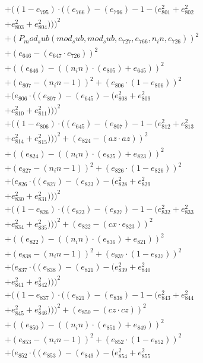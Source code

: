 \documentclass[10pt, a4paper]{article}
\begin{document}
\begin{small}
\begin{align*}
& + ((1 - e_{795})  \cdot  ((e_{766}) - (e_{796}) - 1 - (e_{801}^{2} + e_{802}^{2} \\
& + e_{803}^{2} + e_{804}^{2})))^{2} \\
& + (P_mod_sub(mod_sub, mod_sub, e_{727}, e_{766}, n_in, e_{726}))^{2} \\
& + (e_{646} - (e_{647}  \cdot  e_{726}))^{2} \\
& + ((e_{646}) - ((n_in)  \cdot  (e_{805}) + e_{645}))^{2} \\
& + (e_{807} - (n_in - 1))^{2} + (e_{806}  \cdot  (1 - e_{806}))^{2} \\
& + (e_{806}  \cdot  ((e_{807}) - (e_{645}) - (e_{808}^{2} + e_{809}^{2} \\
& + e_{810}^{2} + e_{811}^{2})))^{2} \\
& + ((1 - e_{806})  \cdot  ((e_{645}) - (e_{807}) - 1 - (e_{812}^{2} + e_{813}^{2} \\
& + e_{814}^{2} + e_{815}^{2})))^{2} + (e_{824} - (az  \cdot  az))^{2} \\
& + ((e_{824}) - ((n_in)  \cdot  (e_{825}) + e_{823}))^{2} \\
& + (e_{827} - (n_in - 1))^{2} + (e_{826}  \cdot  (1 - e_{826}))^{2} \\
& + (e_{826}  \cdot  ((e_{827}) - (e_{823}) - (e_{828}^{2} + e_{829}^{2} \\
& + e_{830}^{2} + e_{831}^{2})))^{2} \\
& + ((1 - e_{826})  \cdot  ((e_{823}) - (e_{827}) - 1 - (e_{832}^{2} + e_{833}^{2} \\
& + e_{834}^{2} + e_{835}^{2})))^{2} + (e_{822} - (cx  \cdot  e_{823}))^{2} \\
& + ((e_{822}) - ((n_in)  \cdot  (e_{836}) + e_{821}))^{2} \\
& + (e_{838} - (n_in - 1))^{2} + (e_{837}  \cdot  (1 - e_{837}))^{2} \\
& + (e_{837}  \cdot  ((e_{838}) - (e_{821}) - (e_{839}^{2} + e_{840}^{2} \\
& + e_{841}^{2} + e_{842}^{2})))^{2} \\
& + ((1 - e_{837})  \cdot  ((e_{821}) - (e_{838}) - 1 - (e_{843}^{2} + e_{844}^{2} \\
& + e_{845}^{2} + e_{846}^{2})))^{2} + (e_{850} - (cz  \cdot  cz))^{2} \\
& + ((e_{850}) - ((n_in)  \cdot  (e_{851}) + e_{849}))^{2} \\
& + (e_{853} - (n_in - 1))^{2} + (e_{852}  \cdot  (1 - e_{852}))^{2} \\
& + (e_{852}  \cdot  ((e_{853}) - (e_{849}) - (e_{854}^{2} + e_{855}^{2} \\

\end{align*}
\end{small}
\end{document}
